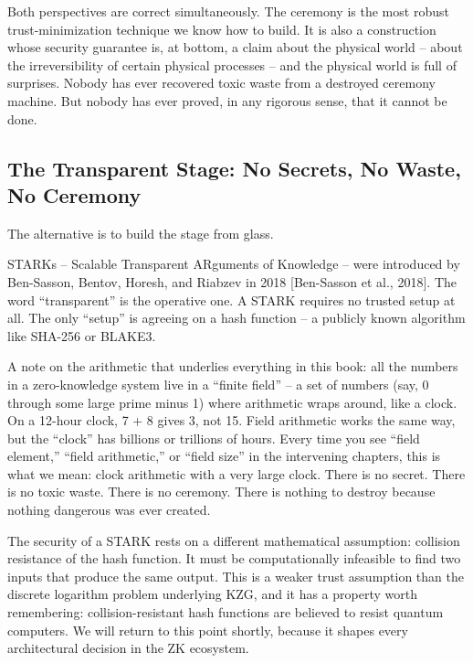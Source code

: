 \documentclass[
  11pt,
  openany]{report}
\begin{document}
Both perspectives are correct simultaneously. The ceremony is the most robust
trust-minimization technique we know how to build. It is also a construction
whose security guarantee is, at bottom, a claim about the physical world --
about the irreversibility of certain physical processes -- and the physical
world is full of surprises. Nobody has ever recovered toxic waste from a
destroyed ceremony machine. But nobody has ever proved, in any rigorous sense,
that it cannot be done.

\subsection{The Transparent Stage: No Secrets, No Waste, No
Ceremony}\label{the-transparent-stage-no-secrets-no-waste-no-ceremony}

The alternative is to build the stage from glass.

STARKs -- Scalable Transparent ARguments of Knowledge -- were introduced by
Ben-Sasson, Bentov, Horesh, and Riabzev in 2018 {[}Ben-Sasson et al., 2018{]}.
The word ``transparent'' is the operative one. A STARK requires no trusted setup
at all. The only ``setup'' is agreeing on a hash function -- a publicly known
algorithm like SHA-256 or BLAKE3.

A note on the arithmetic that underlies everything in this book: all the numbers
in a zero-knowledge system live in a ``finite field'' -- a set of numbers (say,
0 through some large prime minus 1) where arithmetic wraps around, like a clock.
On a 12-hour clock, 7 + 8 gives 3, not 15. Field arithmetic works the same way,
but the ``clock'' has billions or trillions of hours. Every time you see ``field
element,'' ``field arithmetic,'' or ``field size'' in the intervening chapters,
this is what we mean: clock arithmetic with a very large clock. There is no
secret. There is no toxic waste. There is no ceremony. There is nothing to
destroy because nothing dangerous was ever created.

The security of a STARK rests on a different mathematical assumption: collision
resistance of the hash function. It must be computationally infeasible to find
two inputs that produce the same output. This is a weaker trust assumption than
the discrete logarithm problem underlying KZG, and it has a property worth
remembering: collision-resistant hash functions are believed to resist quantum
computers. We will return to this point shortly, because it shapes every
architectural decision in the ZK ecosystem.
\end{document}
